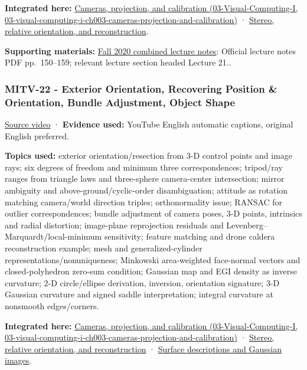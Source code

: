 \textbf{Integrated here:} \href{../03-Visual-Computing-I/main.pdf\#nameddest=03-visual-computing-i-ch003-cameras-projection-and-calibration}{Cameras, projection, and calibration (03-Visual-Computing-I, 03-visual-computing-i-ch003-cameras-projection-and-calibration)} · \hyperref[04-visual-computing-ii-ch032-stereo-relative-orientation-and-reconstruction]{Stereo, relative orientation, and reconstruction}.

\textbf{Supporting materials:} \href{https://ocw.mit.edu/courses/6-801-machine-vision-fall-2020/9ec44f69e72995c370b3797818ba01e6_MIT6_801F20_lectureNotes.pdf}{Fall 2020 combined lecture notes}: Official lecture notes PDF pp.~150--159; relevant lecture section headed Lecture 21..

\subsubsection{MITV-22 - Exterior Orientation, Recovering Position \& Orientation, Bundle Adjustment, Object Shape}\label{04-visual-computing-ii-ch036-mitv-22---exterior-orientation-recovering-position-orientation-bundle-adjustment-object-shape}

\href{https://www.youtube.com/watch?v=x4F1oqm7ETk}{Source video} · \textbf{Evidence used:} YouTube English automatic captions, original English preferred.

\textbf{Topics used:} exterior orientation/resection from 3-D control points and image rays; six degrees of freedom and minimum three correspondences; tripod/ray ranges from triangle laws and three-sphere camera-center intersection; mirror ambiguity and above-ground/cyclic-order disambiguation; attitude as rotation matching camera/world direction triples; orthonormality issue; RANSAC for outlier correspondences; bundle adjustment of camera poses, 3-D points, intrinsics and radial distortion; image-plane reprojection residuals and Levenberg--Marquardt/local-minimum sensitivity; feature matching and drone caldera reconstruction example; mesh and generalized-cylinder representations/nonuniqueness; Minkowski area-weighted face-normal vectors and closed-polyhedron zero-sum condition; Gaussian map and EGI density as inverse curvature; 2-D circle/ellipse derivation, inversion, orientation signature; 3-D Gaussian curvature and signed saddle interpretation; integral curvature at nonsmooth edges/corners.

\textbf{Integrated here:} \href{../03-Visual-Computing-I/main.pdf\#nameddest=03-visual-computing-i-ch003-cameras-projection-and-calibration}{Cameras, projection, and calibration (03-Visual-Computing-I, 03-visual-computing-i-ch003-cameras-projection-and-calibration)} · \hyperref[04-visual-computing-ii-ch032-stereo-relative-orientation-and-reconstruction]{Stereo, relative orientation, and reconstruction} · \hyperref[04-visual-computing-ii-ch032-surface-descriptions-and-gaussian-images]{Surface descriptions and Gaussian images}.

